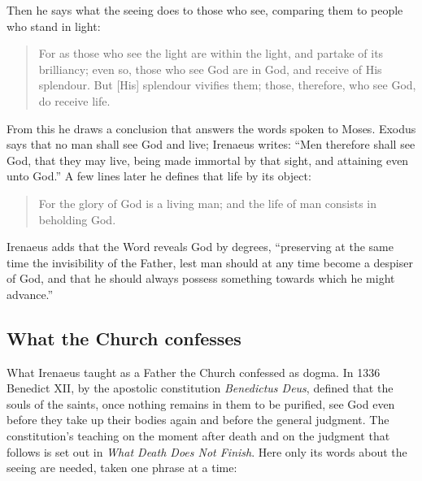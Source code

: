 Then he says what the seeing does to those who see, comparing them to people who stand in light:

\begin{quote}
For as those who see the light are within the light, and partake of its brilliancy; even so, those who see God are in God, and receive of His splendour. But [His] splendour vivifies them; those, therefore, who see God, do receive life.
\end{quote}

From this he draws a conclusion that answers the words spoken to Moses. Exodus says that no man shall see God and live; Irenaeus writes: ``Men therefore shall see God, that they may live, being made immortal by that sight, and attaining even unto God.'' A few lines later he defines that life by its object:

\begin{quote}
For the glory of God is a living man; and the life of man consists in beholding God.
\end{quote}

Irenaeus adds that the Word reveals God by degrees, ``preserving at the same time the invisibility of the Father, lest man should at any time become a despiser of God, and that he should always possess something towards which he might advance.''

\subsection{What the Church confesses}

What Irenaeus taught as a Father the Church confessed as dogma. In 1336 Benedict XII, by the apostolic constitution \emph{Benedictus Deus}, defined that the souls of the saints, once nothing remains in them to be purified, see God even before they take up their bodies again and before the general judgment. The constitution's teaching on the moment after death and on the judgment that follows is set out in \emph{What Death Does Not Finish}. Here only its words about the seeing are needed, taken one phrase at a time:

\begin{quote}
\end{quote}

